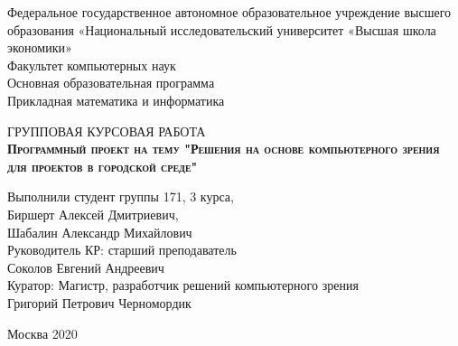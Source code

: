 \begin{titlepage}
    \newpage

    {
    \begin{center}
        Федеральное государственное автономное образовательное учреждение высшего образования «Национальный исследовательский университет «Высшая школа экономики»
        \\
        \bigskip
        Факультет компьютерных наук \\
        Основная образовательная программа \\
        Прикладная математика и информатика \\
    \end{center}
    }

    \vspace{8em}

    \begin{center}
    {\Large ГРУППОВАЯ КУРСОВАЯ РАБОТА}
        \\
        \textsc{\textbf{
        Программный проект на тему
        \linebreak
        "Решения на основе компьютерного зрения для проектов в городской среде"}}
    \end{center}

    \vspace{2em}

    {
    \hfill\parbox{16cm}{
    \hspace*{5cm}\hspace*{-5cm}Выполнили студент группы 171, 3 курса,\\
    Биршерт Алексей Дмитриевич,\\
    Шабалин Александр Михайлович\\

    \hspace*{5cm}\hspace*{-5cm}Руководитель КР: старший преподаватель\\ Соколов Евгений Андреевич
    \\


    \hspace*{5cm}\hspace*{-5cm}Куратор: Магистр, разработчик решений компьютерного зрения \\
    Григорий Петрович Черномордик
    \\
    }
    }

    \vspace{\fill}

    \begin{center}
        Москва 2020
    \end{center}

\end{titlepage}